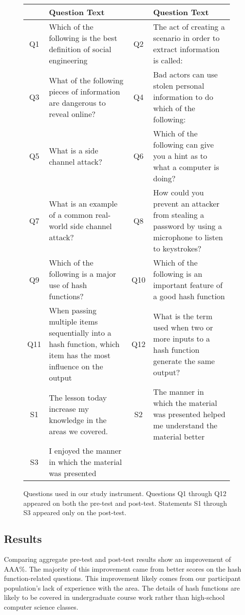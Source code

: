 \begin{figure*}[htb!]
  \scriptsize
  \begin{tabular}{c | p{8cm} | c | p{8cm}}
   & Question Text  &     & Question Text\\
\hline
Q1 & Which of the following is the best definition of social engineering  & Q2  & The act of creating a scenario in order to extract information is called:   \\
Q3 & What of the following pieces of information are dangerous to reveal online?  & Q4  & Bad actors can use stolen personal information to do which of the following: \\
Q5 & What is a side channel attack?  & Q6  & Which of the following can give you a hint as to what a computer is doing?   \\
Q7 & What is an example of a common real-world side channel attack?  & Q8  & How could you prevent an attacker from stealing a password by using a microphone to listen to keystrokes?\\
Q9 & Which of the following is a major use of hash functions? & Q10 & Which of the following is an important feature of a good hash function  \\
Q11 & When passing multiple items sequentially into a hash function, which item has the most influence on the output & Q12 & What is the term used when two or more inputs to a hash function generate the same output? \\
\hline
S1 & The lesson today increase my knowledge in the areas we covered. & S2  & The manner in which the material was presented helped me understand the material better\\
S3 & I enjoyed the manner in which the material was presented &     &              \\
\end{tabular}
\caption{Questions used in our study instrument.  Questions Q1 through Q12
    appeared on both the pre-test and post-test.  Statements S1 through S3
    appeared only on the post-test.}
\label{fig:assessment}
\end{figure*}


\subsection{Results}

Comparing aggregate pre-test and post-test results show an improvement of
AAA\%.  The majority of this improvement came from better scores on the
hash function-related questions.  This improvement likely comes from our
participant population's lack of experience with the area.  The details of
hash functions are likely to be covered in undergraduate course work rather
than high-school computer science classes.

